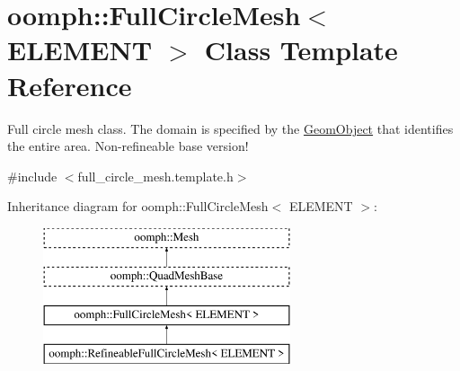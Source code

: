\hypertarget{classoomph_1_1FullCircleMesh}{}\section{oomph\+:\+:Full\+Circle\+Mesh$<$ E\+L\+E\+M\+E\+NT $>$ Class Template Reference}
\label{classoomph_1_1FullCircleMesh}


Full circle mesh class. The domain is specified by the \hyperlink{classoomph_1_1GeomObject}{Geom\+Object} that identifies the entire area. Non-\/refineable base version!  




{\ttfamily \#include $<$full\+\_\+circle\+\_\+mesh.\+template.\+h$>$}

Inheritance diagram for oomph\+:\+:Full\+Circle\+Mesh$<$ E\+L\+E\+M\+E\+NT $>$\+:\begin{figure}[H]
\begin{center}
\leavevmode
\includegraphics[height=4.000000cm]{classoomph_1_1FullCircleMesh}
\end{center}
\end{figure}
